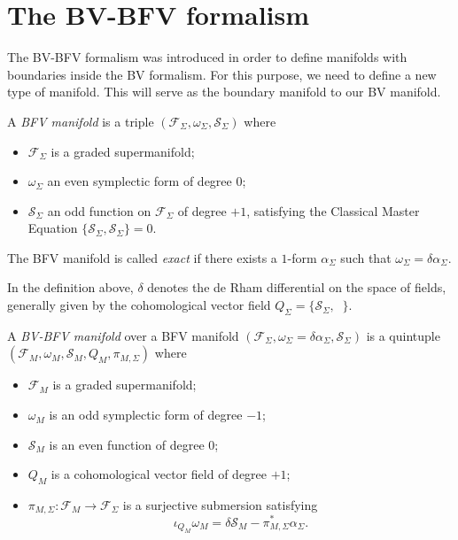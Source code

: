 \section{The BV-BFV formalism}
\label{sec:BF-BFV}

The BV-BFV formalism was introduced in order to define manifolds with boundaries inside the BV formalism.
For this purpose, we need to define a new type of manifold. This will serve as the boundary manifold to our BV manifold.

\begin{definition}
\label{def:BFV_manifold}
    A \emph{BFV manifold} is a triple $(\mathcal{F}_\Sigma, \omega_\Sigma, \mathcal{S}_\Sigma)$ where
    \begin{itemize}
        \item $\mathcal{F}_\Sigma$ is a graded supermanifold;
        \item $\omega_\Sigma$ an even symplectic form of degree $0$;
        \item $\mathcal{S}_\Sigma$ an odd function on $\mathcal{F}_\Sigma$ of degree $+1$, satisfying the Classical Master Equation $\{\mathcal{S}_\Sigma, \mathcal{S}_\Sigma\} = 0$.
    \end{itemize}
    The BFV manifold is called \emph{exact} if there exists a $1$-form $\alpha_\Sigma$ such that $\omega_\Sigma = \delta \alpha_\Sigma$.
\end{definition}

In the definition above, $\delta$ denotes the de Rham differential on the space of fields, generally given by the cohomological vector field $Q_\Sigma = \{\mathcal{S}_\Sigma, \;\;\}$.

\begin{definition}
\label{def:BV-BFV}
    A \emph{BV-BFV manifold} over a BFV manifold $(\mathcal{F}_\Sigma, \omega_\Sigma = \delta \alpha_\Sigma, \mathcal{S}_\Sigma)$ is a quintuple $(\mathcal{F}_M, \omega_M, \mathcal{S}_M, Q_M, \pi_{M, \Sigma})$ where
    \begin{itemize}
        \item $\mathcal{F}_M$ is a graded supermanifold;
        \item $\omega_M$ is an odd symplectic form of degree $-1$;
        \item $\mathcal{S}_M$ is an even function of degree $0$;
        \item $Q_M$ is a cohomological vector field of degree $+1$;
        \item $\pi_{M, \Sigma}: \mathcal{F}_M \rightarrow \mathcal{F}_\Sigma$ is a surjective submersion satisfying
        \begin{equation}
            \iota_{Q_M} \omega_M = \delta \mathcal{S}_M - \pi^*_{M,\Sigma} \alpha_\Sigma.
        \end{equation}
    \end{itemize}
\end{definition}


